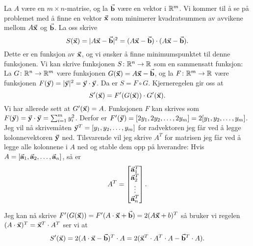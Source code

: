 \begin{eksempel}
  La $A$ være en $m \times n$-matrise, og la $\vec{\mathbf{b}}$ være en vektor i $\mathbb{R}^m$.
  Vi kommer til å se på problemet med å finne en vektor $\vec{\mathbf{x}}$ som minimerer
  kvadratsummen av avvikene mellom $A\vec{\mathbf{x}}$ og $\vec{\mathbf{b}}$. La oss skrive
  $$S(\vec{\mathbf{x}}) = |A\vec{\mathbf{x}} - \vec{\mathbf{b}}|^2 = (A\vec{\mathbf{x}} - \vec{\mathbf{b}}) \cdot (A\vec{\mathbf{x}} - \vec{\mathbf{b}}).$$  
  Dette er en funksjon av $\vec{\mathbf{x}}$, og vi ønsker å finne minimumspunktet til denne funksjonen.
  Vi kan skrive funksjonen $S \colon \mathbb{R}^n \to \mathbb{R}$ som en sammensatt funksjon: La $G \colon \mathbb{R}^n \to \mathbb{R}^m$
  være funksjonen $G(\vec{\mathbf{x}}) = A\vec{\mathbf{x}} - \vec{\mathbf{b}}$, og la $F \colon \mathbb{R}^m \to \mathbb{R}$ være funksjonen
  $F(\vec{\mathbf{y}}) = |\vec{\mathbf{y}}|^2 = \vec{\mathbf{y}} \cdot \vec{\mathbf{y}}$. Da er $S = F \circ G$.
  Kjerneregelen gir oss at
  $$S'(\vec{\mathbf{x}}) = F'(G(\vec{\mathbf{x}})) \cdot G'(\vec{\mathbf{x}}).$$
  Vi har allerede sett at $G'(\vec{\mathbf{x}}) = A$.
  Funksjonen $F$ kan skrives som $F(\vec{\mathbf{y}}) = \vec{\mathbf{y}} \cdot \vec{\mathbf{y}} = \sum_{i=1}^m y_i^2$.
  Derfor er $F'(\vec{\mathbf{y}}) = [2y_1, 2y_2, \ldots, 2y_m] = 2[y_1, y_2, \dots, y_m]$.
  Jeg vil nå skrivemåten $\vec{\mathbf{y}}^T = [y_1, y_2, \dots, y_m]$ for radvektoren jeg får
  ved å legge kolonnevektoren $\vec{\mathbf{y}}$ ned.
  Tilsvarende vil jeg skrive $A^T$ for matrisen jeg får ved å legge alle
  kolonnene i $A$ ned og stable dem opp på hverandre:
  Hvis $A = [\vec{\mathbf{a}}_1, \vec{\mathbf{a}}_2, \dots, \vec{\mathbf{a}}_n]$, så er
  $$A^T = \begin{bmatrix}\vec{\mathbf{a}}_1^T \\ \vec{\mathbf{a}}_2^T \\ \vdots \\ \vec{\mathbf{a}}_n^T\end{bmatrix}.$$

  Jeg kan nå skrive $F'(G(\vec{\mathbf{x}})) = F'(A\cdot \vec{\mathbf{x}} + \vec{\mathbf{b}}) = 2(A
  \vec{\mathbf{x}} + b)^T$ så
  bruker vi regelen $(A \cdot \vec{\mathbf{x}})^T = \vec{\mathbf{x}}^T \cdot A^T$ ser vi at
  $$S'(\vec{\mathbf{x}}) = 2(A\cdot \vec{\mathbf{x}} - \vec{\mathbf{b}})^T \cdot A = 2(\vec{\mathbf{x}}^T
  \cdot A^T \cdot A - \vec{\mathbf{b}}^T \cdot A).$$
\end{eksempel}
